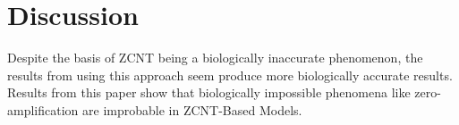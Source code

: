 \section{Discussion}

Despite the basis of ZCNT being a biologically inaccurate phenomenon, the results from using this approach seem produce more biologically accurate results. Results from this paper show that biologically impossible phenomena like zero-amplification are improbable in ZCNT-Based Models. 

